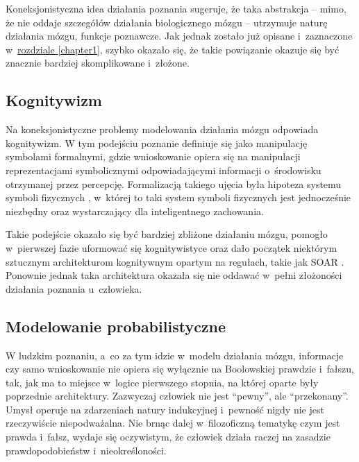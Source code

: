 Koneksjonistyczna idea działania poznania sugeruje, że taka abstrakcja -- mimo, że nie oddaje szczegółów działania biologicznego mózgu -- utrzymuje naturę działania mózgu, funkcje poznawcze.
Jak jednak zostało już opisane i~zaznaczone w~\hyperref[chapter1]{rozdziale \ref*{chapter1}}, szybko okazało się, że takie powiązanie okazuje się być znacznie bardziej skomplikowane i~złożone.

\subsection{Kognitywizm}

Na koneksjonistyczne problemy modelowania działania mózgu odpowiada kognitywizm.
W tym podejściu poznanie definiuje się jako manipulację symbolami formalnymi, gdzie wnioskowanie opiera się na manipulacji reprezentacjami symbolicznymi odpowiadającymi informacji o~środowisku otrzymanej przez percepcję.
Formalizacją takiego ujęcia była hipoteza systemu symboli fizycznych \cite{newell1981computer}, w~której to taki system symboli fizycznych jest jednocześnie niezbędny oraz wystarczający dla inteligentnego zachowania.

Takie podejście okazało się być bardziej zbliżone działaniu mózgu, pomogło w~pierwszej fazie uformować się kognitywistyce oraz dało początek niektórym sztucznym architekturom kognitywnym opartym na regułach, takie jak SOAR \cite{laird2019soar}\footnotemark.
Ponownie jednak taka architektura okazała się nie oddawać w~pełni złożoności działania poznania u~człowieka.

\subsection{Modelowanie probabilistyczne}

W ludzkim poznaniu, a~co za tym idzie w~modelu działania mózgu, informacje czy samo wnioskowanie nie opiera się wyłącznie na Boolowskiej prawdzie i~fałszu, tak, jak ma to miejsce w~logice pierwszego stopnia, na której oparte były poprzednie architektury.
Zazwyczaj człowiek nie jest ``pewny'', ale ``przekonany''.
Umysł operuje na zdarzeniach natury indukcyjnej i~pewność nigdy nie jest rzeczywiście niepodważalna.
Nie brnąc dalej w~filozoficzną tematykę czym jest prawda i~fałsz, wydaje się oczywistym, że człowiek działa raczej na zasadzie prawdopodobieństw i~nieokreśloności.


